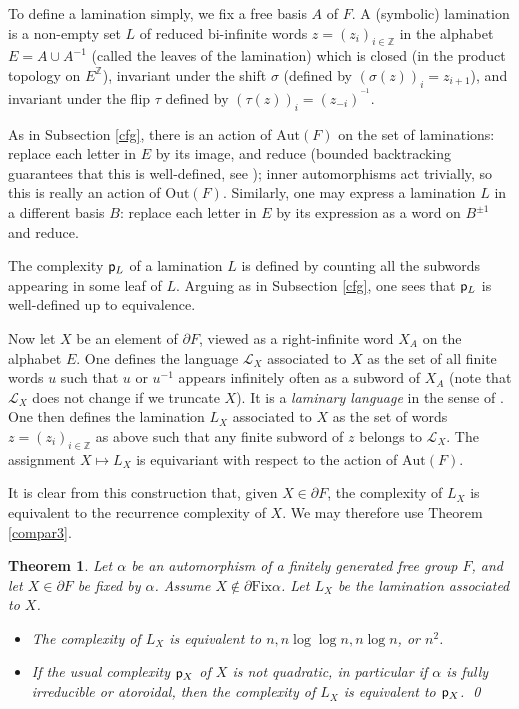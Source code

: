 \documentclass[11pt]{amsart}
\newtheorem{thm}{Theorem}[section]
\theoremstyle{remark}
\newcommand{\m} {^{-1}}
\newcommand {\call} {{\mathcal {L}}}
\newcommand{\Fix}{{\mathrm{Fix}}}
\newcommand{\Out} {{\mathrm{Out}}}
\newcommand{\Aut} {{\mathrm{Aut}}}
\newcommand{\cp}{{\sf  p}}
\newcommand{\Z}{{\mathbb {Z}}}
\newcommand{\bo}{\partial}
\begin{document}
To define a lamination simply, we fix a free basis $A$ of $F$. A (symbolic) lamination is a non-empty set $L$ of reduced bi-infinite words $z=(z_i)_{i\in\Z}$ in the alphabet $E=A\cup A^{-1}$ (called the leaves of the lamination)  which is closed (in the product topology on $E^\Z$), invariant under the shift $\sigma$ (defined by  $(\sigma(z))_i=z_{i+1}$), and invariant under the flip $\tau$ defined by $(\tau(z))_i=(z_{-i})^{\m}$.

As in Subsection \ref{cfg}, there is an action of $\Aut(F)$ on the set of laminations: replace each letter in $E$ by its image, and reduce   (bounded backtracking guarantees that this is well-defined, see \cite{CHL1});  inner automorphisms act trivially, so this is really an action of $\Out(F)$. Similarly, one may express a lamination $L$ in a different basis $B$: replace each letter in $E$ by its expression as a word on $B^{\pm1}$ and reduce.

The complexity $\cp_L$ of a lamination $L$ is defined by counting all the subwords appearing in some leaf of $L$. Arguing as in Subsection \ref{cfg}, one sees that $\cp_L$ is well-defined up to equivalence.

Now let $X$ be an element of $\bo F$, viewed as a right-infinite word $X_A$ on the alphabet $E$. One defines the language $\call_X$ associated to $X$ as the set of all finite words $u$ such that $u$ or $u\m$ appears infinitely often as a subword of $X_A$   (note that $\call_X$ does not change if we truncate $X$). It is a \emph{laminary language} in the sense of \cite{CHL1}. One then defines the lamination $L_X$ associated to $X$ as the set of words $z=(z_i)_{i\in\Z}$ as above such that any finite subword of $z$ belongs to $\call_X$. The assignment $X\mapsto L_X$  is equivariant with respect to the action of $\Aut(F)$.

It is clear from this construction that, given $X\in\bo F$, the complexity of $L_X$ is equivalent to the recurrence complexity of $X$. We may therefore use Theorem \ref{compar3}.

\begin{thm} \label{comparlam}
Let $\alpha$ be an automorphism of a finitely generated free group $F$, and let $X\in\bo F$ be fixed by $\alpha$. Assume $X\notin\bo\Fix\alpha$. Let $L_X$ be the lamination associated to $X$.

\begin{itemize}
\item The   complexity of $L_X$ is equivalent to $n,n\log\log n, n\log n$, or $n^2$.
\item If the usual complexity   $\cp_X$ of $X$ is not quadratic, in particular if $\alpha$ is fully irreducible or atoroidal, then the complexity of $L_X$ is equivalent to $\cp_X$. \qed
\end{itemize}
\end{thm}
\end{document}
